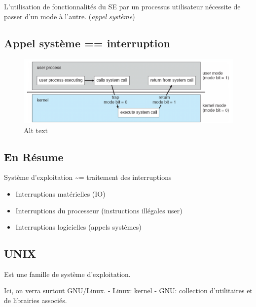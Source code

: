 L'utilisation de fonctionnalités du SE par un processus utilisateur
nécessite de passer d'un mode à l'autre. (\emph{appel système})

\subsection{Appel système ==
interruption}\label{appel-systuxe8me-interruption}

\begin{figure}
\centering
\includegraphics{image-2.png}
\caption{Alt text}
\end{figure}

\subsection{En Résume}\label{en-ruxe9sume}

Système d'exploitation \textasciitilde= traitement des interruptions

\begin{itemize}
\tightlist
\item
  Interruptions matérielles (IO)
\item
  Interruptions du processeur (instructions illégales user)
\item
  Interruptions logicielles (appels systèmes)
\end{itemize}

\subsection{UNIX}\label{unix}

Est une famille de système d'exploitation.

Ici, on verra surtout GNU/Linux. - Linux: kernel - GNU: collection
d'utilitaires et de librairies associés.


